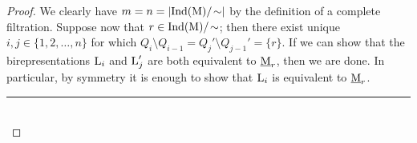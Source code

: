 \noindent\begin{proof} We clearly have $m = n = \lvert\textup{Ind}(\textup{M})/\!\sim\rvert$ by the definition of a complete filtration. Suppose now that $r \in \textup{Ind}(\textup{M})/\!\sim$; then there exist unique $i, j \in \{1, 2, \dots, n\}$ for which $Q_i\setminus Q_{i-1} = Q_j'\setminus Q_{j-1}' = \{r\}$. If we can show that the birepresentations $\textup{L}_i$ and $\textup{L}_j'$ are both equivalent to $\underline{\textup{M}}_r$, then we are done. In particular, by symmetry it is enough to show that $\textup{L}_i$ is equivalent to $\underline{\textup{M}}_r$.\\[-1.5\baselineskip]
\begin{center}
\rule{0.5\linewidth}{1pt}
\end{center}
\noindent\\[-\baselineskip]

\end{proof}
